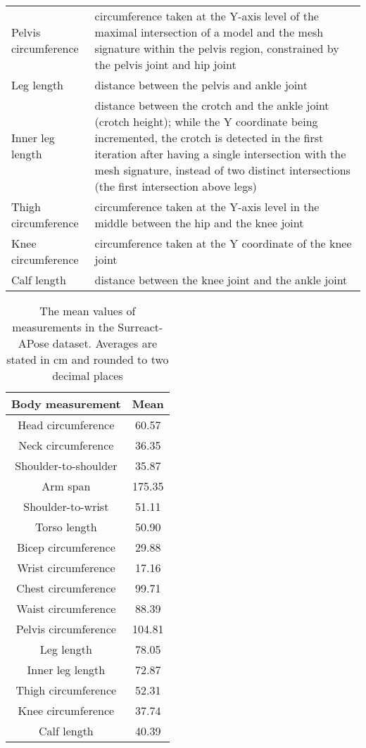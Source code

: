 \begin{table}
\begin{center}
\begin{tabularx}{\textwidth}{lX}
			Pelvis circumference & circumference taken at the Y-axis level of the maximal intersection of a model and the mesh signature within the pelvis region, constrained by the pelvis joint and hip joint\\
			Leg length & distance between the pelvis and ankle joint\\
			Inner leg length & distance between the crotch and the ankle joint (crotch height); while the Y coordinate being incremented, the crotch is detected in the first iteration after having a single intersection with the mesh signature, instead of two distinct intersections (the first intersection above legs)\\
			Thigh circumference & circumference taken at the Y-axis level in the middle between the hip and the knee joint\\
			Knee circumference & circumference taken at the Y coordinate of the knee joint\\
			Calf length & distance between the knee joint and the ankle joint\\\hline
		\end{tabularx}
	\end{center}
\end{table}

\begin{table}
	\caption[Mean values of Surreact-APose dataset]{The mean values of measurements in the Surreact-APose dataset. Averages are stated in cm and rounded to two decimal places}
	\label{avgMeasurementsSurreact}
	\begin{center}
		\begin{tabular}{c c}\hline
			Body measurement & Mean\\\hline
			\hline
			Head circumference &60.57\\
			Neck circumference &36.35\\
			Shoulder-to-shoulder & 35.87\\
			Arm span & 175.35\\
			Shoulder-to-wrist & 51.11\\
			Torso length & 50.90\\
			Bicep circumference &29.88\\
			Wrist circumference &17.16\\
			Chest circumference & 99.71\\
			Waist circumference & 88.39\\
			Pelvis circumference &104.81\\
			Leg length & 78.05\\
			Inner leg length & 72.87\\
			Thigh circumference &52.31\\
			Knee circumference & 37.74\\
			Calf length &40.39\\\hline
		\end{tabular}
	\end{center}
\end{table}

